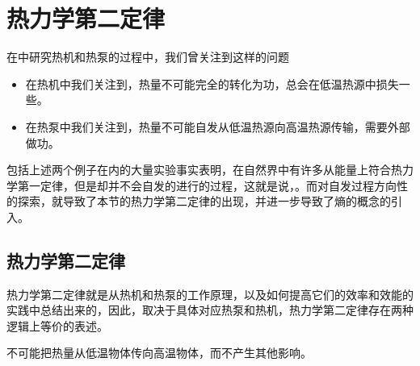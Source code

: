 \section{热力学第二定律}
\label{sec:热力学第二定律}
在中研究热机和热泵的过程中，我们曾关注到这样的问题
\begin{itemize}
    \item 在热机中我们关注到，热量不可能完全的转化为功，总会在低温热源中损失一些。
    \item 在热泵中我们关注到，热量不可能自发从低温热源向高温热源传输，需要外部做功。
\end{itemize}
包括上述两个例子在内的大量实验事实表明，在自然界中有许多从能量上符合热力学第一定律，但是却并不会自发的进行的过程，这就是说，。而对自发过程方向性的探索，就导致了本节的热力学第二定律的出现，并进一步导致了熵的概念的引入。

\subsection{热力学第二定律}
\label{subsec:热力学第二定律}
热力学第二定律就是从热机和热泵的工作原理，以及如何提高它们的效率和效能的实践中总结出来的，因此，取决于具体对应热泵和热机，热力学第二定律存在两种逻辑上等价的表述。

\begin{OldBoxLaw}[热力学第二定律的克劳修斯表述]
    不可能把热量从低温物体传向高温物体，而不产生其他影响。
\end{OldBoxLaw}

